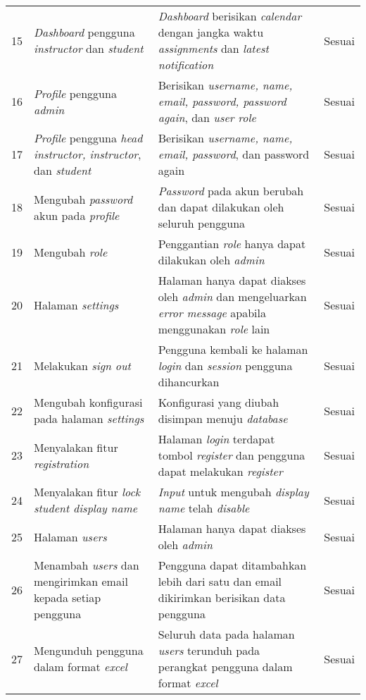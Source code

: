 \begin{longtable}[H]{|p{0.5cm}| p{5.5cm}| p{6cm}| p{2.5cm}|}
15 & \textit{Dashboard} pengguna \textit{instructor} dan \textit{student} & \textit{Dashboard} berisikan \textit{calendar} dengan jangka waktu \textit{assignments} dan \textit{latest notification} & Sesuai\\ \cline{1-4}
16 & \textit{Profile} pengguna \textit{admin} & Berisikan \textit{username, name, email, password, password again}, dan \textit{user role} & Sesuai\\ \cline{1-4}
17 & \textit{Profile} pengguna \textit{head instructor, instructor}, dan \textit{student} & Berisikan \textit{username, name, email, password}, dan password again & Sesuai\\ \cline{1-4}
18 & Mengubah \textit{password} akun pada \textit{profile} & \textit{Password} pada akun berubah dan dapat dilakukan oleh seluruh pengguna & Sesuai\\ \cline{1-4}
19 & Mengubah \textit{role} & Penggantian \textit{role} hanya dapat dilakukan oleh \textit{admin} & Sesuai\\ \cline{1-4}
20 & Halaman \textit{settings} & Halaman hanya dapat diakses oleh \textit{admin} dan mengeluarkan \textit{error message} apabila menggunakan \textit{role} lain & Sesuai\\ \cline{1-4}
21 & Melakukan \textit{sign out} & Pengguna kembali ke halaman \textit{login} dan \textit{session} pengguna dihancurkan & Sesuai\\ \cline{1-4}
22 & Mengubah konfigurasi pada halaman \textit{settings} & Konfigurasi yang diubah disimpan menuju \textit{database}  & Sesuai\\ \cline{1-4}
23 & Menyalakan fitur \textit{registration} & Halaman \textit{login} terdapat tombol \textit{register} dan pengguna dapat melakukan \textit{register} & Sesuai\\ \cline{1-4}
24 & Menyalakan fitur \textit{lock student display name} & \textit{Input} untuk mengubah \textit{display name} telah \textit{disable} & Sesuai\\ \cline{1-4}
25 & Halaman \textit{users} & Halaman hanya dapat diakses oleh \textit{admin} & Sesuai\\ \cline{1-4}
26 & Menambah \textit{users} dan mengirimkan email kepada setiap pengguna & Pengguna dapat ditambahkan lebih dari satu dan email dikirimkan berisikan data pengguna & Sesuai\\ \cline{1-4}
27 & Mengunduh pengguna dalam format \textit{excel} & Seluruh data pada halaman \textit{users} terunduh pada perangkat pengguna dalam format \textit{excel} & Sesuai\\ \cline{1-4}

\end{longtable}
